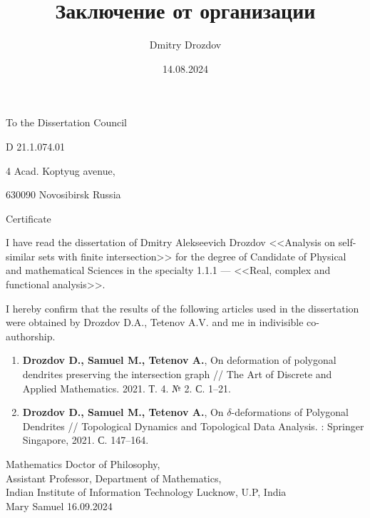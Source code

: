 \documentclass[14pt, a4paper]{extarticle}
\title{Заключение от организации}
\author{Dmitry Drozdov}
\date{14.08.2024}
\begin{document}
\noindent\hspace{9cm}To the Dissertation Council

\noindent\hspace{9cm}D 21.1.074.01

\noindent\hspace{9cm}4 Acad. Koptyug avenue, 

\noindent\hspace{9cm}630090 Novosibirsk Russia



\begin{center}
Certificate 
\end{center}

I have read the dissertation of Dmitry Alekseevich Drozdov <<Analysis on self-similar sets with finite intersection>> for the degree of Candidate of Physical and mathematical Sciences in the specialty 1.1.1 --- <<Real, complex and functional analysis>>.

I hereby confirm that the results of the following articles used in the dissertation were obtained by Drozdov D.A., Tetenov A.V. and me in indivisible co-authorship.\\

\begin{enumerate}[nolistsep]
\item {\bf Drozdov D., Samuel M., Tetenov A.}, On deformation of polygonal dendrites preserving the intersection graph // The Art of Discrete and Applied Mathematics. 2021. Т. 4. № 2. С. 1--21.
\item {\bf Drozdov D., Samuel M., Tetenov A.}, On $\delta$-deformations of Polygonal Dendrites // Topological Dynamics and Topological Data Analysis. : Springer Singapore, 2021. С. 147--164.
\end{enumerate}

\vspace{1cm}


\noindent Mathematics Doctor of Philosophy,\\
\noindent Assistant Professor, Department of Mathematics,\\
\noindent Indian Institute of Information Technology Lucknow, U.P, India\\
\noindent Mary Samuel \hfill 16.09.2024

\end{document}
